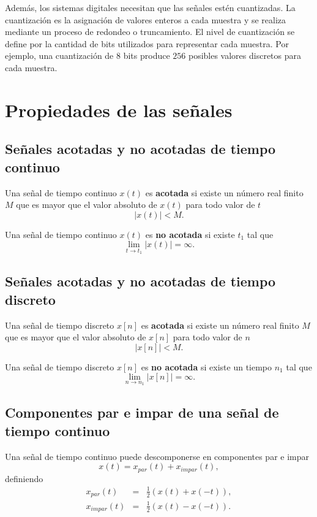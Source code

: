 Además, los sistemas digitales necesitan que las señales estén cuantizadas. La cuantización es la asignación de valores enteros a cada muestra y se realiza mediante un proceso de redondeo o truncamiento. El nivel de cuantización se define por la cantidad de bits utilizados para representar cada muestra. Por ejemplo, una cuantización de $8$ bits produce $256$ posibles valores discretos para cada muestra.

\section{Propiedades de las señales}

\subsection{Señales acotadas y no acotadas de tiempo continuo}
Una señal de tiempo continuo $x(t)$ es \textbf{acotada} si existe un número real finito $M$ que es mayor que el valor absoluto de $x(t)$ para todo valor de $t$
\begin{equation}
	|x(t)| < M.
\end{equation}

Una señal de tiempo continuo $x(t)$ es \textbf{no acotada} si existe $t_{1}$ tal que
\begin{equation}
	\lim_{t \rightarrow t_{1}} |x(t)| = \infty.
\end{equation}

\subsection{Señales acotadas y no acotadas de tiempo discreto}
Una señal de tiempo discreto $x[n]$ es \textbf{acotada} si existe un número real finito $M$ que es mayor que el valor absoluto de $x[n]$ para todo valor de $n$
\begin{equation}
	|x[n]| < M.
\end{equation}

Una señal de tiempo discreto $x[n]$ es \textbf{no acotada} si existe un tiempo $n_{1}$ tal que
\begin{equation}
	\lim_{n \rightarrow n_{1}} |x[n]| = \infty.
\end{equation}

\subsection{Componentes par e impar de una señal de tiempo continuo}
Una señal de tiempo continuo puede descomponerse en componentes par e impar
\begin{equation}
	x(t) = x_{par}(t) + x_{impar}(t),
\end{equation}
definiendo
\begin{eqnarray}
	x_{par}(t) &=& \frac{1}{2}\left( x(t) + x(-t) \right) , \\
	x_{impar}(t) &=& \frac{1}{2}\left( x(t) - x(-t) \right) .
\end{eqnarray}

